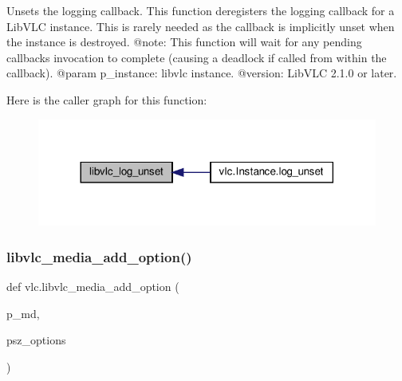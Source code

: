 \begin{DoxyVerb}Unsets the logging callback.
This function deregisters the logging callback for a LibVLC instance.
This is rarely needed as the callback is implicitly unset when the instance
is destroyed.
@note: This function will wait for any pending callbacks invocation to
complete (causing a deadlock if called from within the callback).
@param p_instance: libvlc instance.
@version: LibVLC 2.1.0 or later.
\end{DoxyVerb}
 Here is the caller graph for this function\+:
\nopagebreak
\begin{figure}[H]
\begin{center}
\leavevmode
\includegraphics[width=317pt]{namespacevlc_ab8183b479ddf3d672f4044a9a3805b06_icgraph}
\end{center}
\end{figure}
\mbox{\label{namespacevlc_adbf254196790831139b165b8f20bab19}} 
\subsubsection{\texorpdfstring{libvlc\+\_\+media\+\_\+add\+\_\+option()}{libvlc\_media\_add\_option()}}
{\footnotesize\ttfamily def vlc.\+libvlc\+\_\+media\+\_\+add\+\_\+option (\begin{DoxyParamCaption}\item[{}]{p\+\_\+md,  }\item[{}]{psz\+\_\+options }\end{DoxyParamCaption})}

